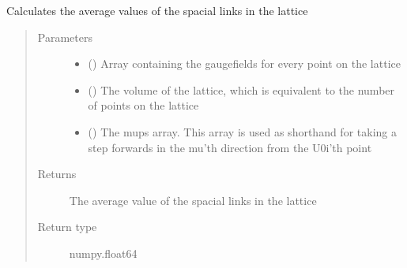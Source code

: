 \documentclass[letterpaper,10pt,english]{sphinxmanual}
\begin{document}
\begin{fulllineitems}
\label{\detokenize{index:su2.calcU_i}}
Calculates the average values of the spacial links in the
lattice
\begin{quote}\begin{description}
\item[{Parameters}] \leavevmode\begin{itemize}
\item {} 
 () \textendash{} Array containing the gaugefields for every point on the lattice

\item {} 
 () \textendash{} The volume of the lattice, which is equivalent to the number of
points on the lattice

\item {} 
 () \textendash{} The mups array. This array is used as shorthand for taking a
step forwards in the mu’th direction from the U0i’th point

\end{itemize}

\item[{Returns}] \leavevmode
The average value of the spacial links in the lattice

\item[{Return type}] \leavevmode
numpy.float64

\end{description}\end{quote}

\end{fulllineitems}

\end{document}

